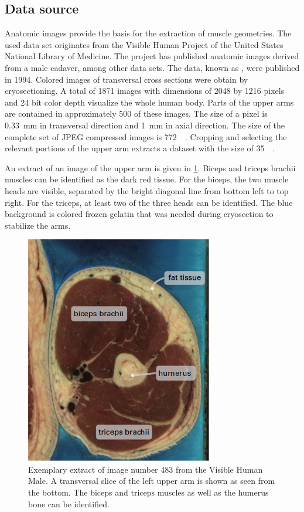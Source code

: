 \subsection{Data source}
Anatomic images provide the basis for the extraction of muscle geometries.
The used data set originates from the Visible Human Project \cite{visible_human_male} of 
the United States National Library of Medicine. 
The project has published anatomic images derived from a male cadaver, among other data sets.
The data, known as , were published in 1994.
Colored images of transversal cross sections were obtain by cryosectioning.
A total of \num{1871} images with dimensions of \num{2048} by \num{1216} pixels and 24 bit color depth visualize the whole human body. Parts of the upper arms are contained in approximately 500 of these images. The size of a pixel is \SI{0.33}{\milli\meter} in transversal direction and \SI{1}{\milli\meter} in axial direction. The size of the complete set of JPEG compressed images is \SI{772}{\mega\byte}. Cropping and selecting the relevant portions of the upper arm extracts a dataset with the size of \SI{35}{\mega\byte}.

An extract of an image of the upper arm is given in \cref{fig:vhp_image}. 
Biceps and triceps brachii muscles can be identified as the dark red tissue. For the biceps, the two muscle heads are visible, separated by the bright diagonal line from bottom left to top right. For the triceps, at least two of the three heads can be identified. The blue background is colored frozen gelatin that was needed during cryosection to stabilize the arms.

\begin{figure}%
  \centering%
  \includegraphics[height=10cm]{images/fiber_creation/vhp.png}%
  \caption{Exemplary extract of image number 483 from the Visible Human Male. A transversal slice of the left upper arm is shown as seen from the bottom. The biceps and triceps muscles as well as the humerus bone can be identified. }%
  \label{fig:vhp_image}%
\end{figure}%

